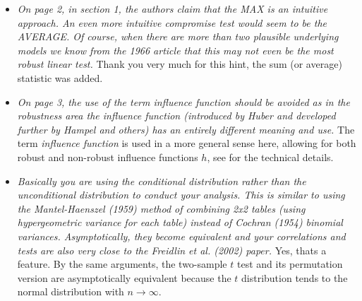 \documentclass{article}
\begin{document}
\begin{itemize}
\item
\textit{
On page 2, in section 1, the authors claim that the MAX is an intuitive approach. An
even more intuitive compromise test would seem to be the AVERAGE. Of course, when
there are more than two plausible underlying models we know from the 1966 article that
this may not even be the most robust linear test.}
Thank you very much for this hint, the sum (or average) statistic was added.

\item
\textit{On page 3, the use of the term influence function should be avoided as in the
robustness area the influence function (introduced by Huber and developed further by
Hampel and others) has an entirely different meaning and use.}
The term \emph{influence function} is used in a more general sense here,
allowing for both robust and non-robust influence functions $h$, see
\cite{StrasserWeber1999} for the technical details.

\item 
\textit{Basically you are using the conditional distribution rather than the unconditional
distribution to conduct your analysis. This is similar to using the Mantel-Haenszel (1959)
method of combining 2x2 tables (using hypergeometric variance for each table) instead
of Cochran (1954) binomial variances. Asymptotically, they become equivalent and your
correlations and tests are also very close to the Freidlin et al. (2002)
paper.}
Yes, thats a feature. By the same arguments, the two-sample $t$ test and
its permutation version are asymptotically equivalent because the
$t$ distribution tends to the normal distribution with $n \rightarrow
\infty$.


\end{itemize}
\end{document}
